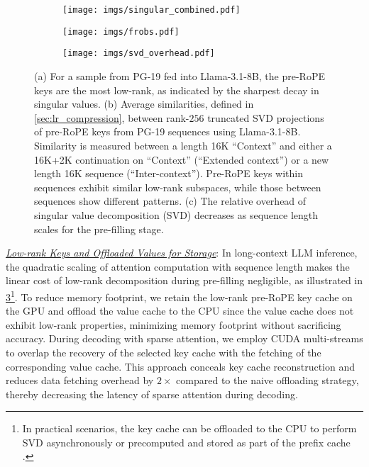 \begin{figure}[t]
    \centering
   \begin{subfigure}[b]{0.32\textwidth}
        \texttt{[image: imgs/singular\_combined.pdf]}
        \caption{}
        \label{fig:singular_combined}
   \end{subfigure}
    \hfill
       \centering
   \begin{subfigure}[b]{0.32\textwidth}
        \texttt{[image: imgs/frobs.pdf]}
        \caption{}
        \label{fig:similarity}
   \end{subfigure}
    \hfill
    \begin{subfigure}[b]{0.32\textwidth}
        \texttt{[image: imgs/svd\_overhead.pdf]}
        \caption{}
        \label{fig:svd_overhead}
   \end{subfigure}
    \hfill
    \caption{(a) For a sample from PG-19 \citep{rae2019compressive, gao2020pile} fed into Llama-3.1-8B, the pre-RoPE keys are the most low-rank, as indicated by the sharpest decay in singular values. (b) Average similarities, defined in \cref{sec:lr_compression}, between rank-$256$ truncated SVD projections of pre-RoPE keys from PG-19 sequences using Llama-3.1-8B. Similarity is measured between a length 16K ``Context'' and either a 16K+2K continuation on ``Context'' (``Extended context'') or a new length 16K sequence (``Inter-context''). Pre-RoPE keys within sequences exhibit similar low-rank subspaces, while those between sequences show different patterns. (c) The relative overhead of singular value decomposition (SVD)  decreases as sequence length scales for the pre-filling stage.}
    \label{fig:observation}
\end{figure}

\underline{\textit{Low-rank Keys and Offloaded Values for Storage}}: In long-context LLM inference, the quadratic scaling of attention computation with sequence length makes the linear cost of low-rank decomposition during pre-filling negligible, as illustrated in \cref{fig:svd_overhead}\footnote{In practical scenarios, the key cache can be offloaded to the CPU to perform SVD asynchronously or precomputed and stored as part of the prefix cache \citep{juravsky2024hydragen}.}. To reduce memory footprint, we retain the low-rank pre-RoPE key cache on the GPU and offload the value cache to the CPU since the value cache does not exhibit low-rank properties, minimizing memory footprint without sacrificing accuracy. During decoding with sparse attention, we employ CUDA multi-streams to overlap the recovery of the selected key cache with the fetching of the corresponding value cache. This approach conceals key cache reconstruction and reduces data fetching overhead by $2\times$ compared to the naive offloading strategy, thereby decreasing the latency of sparse attention during decoding. 


